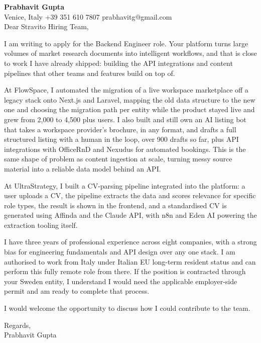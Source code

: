 \documentclass[a4paper,10.5pt]{article}
\begin{document}
\textbf{Prabhavit Gupta}\\
Venice, Italy \textbar{} +39 351 610 7807 \textbar{} prabhavitg@gmail.com\\[10pt]
Dear Stravito Hiring Team,

I am writing to apply for the Backend Engineer role. Your platform turns large volumes of market research documents into intelligent workflows, and that is close to work I have already shipped: building the API integrations and content pipelines that other teams and features build on top of.

At FlowSpace, I automated the migration of a live workspace marketplace off a legacy stack onto Next.js and Laravel, mapping the old data structure to the new one and choosing the migration path per entity while the product stayed live and grew from 2,000 to 4,500 plus users. I also built and still own an AI listing bot that takes a workspace provider's brochure, in any format, and drafts a full structured listing with a human in the loop, over 900 drafts so far, plus API integrations with OfficeRnD and Nexudus for automated bookings. This is the same shape of problem as content ingestion at scale, turning messy source material into a reliable data model behind an API.

At UltraStrategy, I built a CV-parsing pipeline integrated into the platform: a user uploads a CV, the pipeline extracts the data and scores relevance for specific role types, the result is shown in the frontend, and a standardised CV is generated using Affinda and the Claude API, with n8n and Eden AI powering the extraction tooling itself.

I have three years of professional experience across eight companies, with a strong bias for engineering fundamentals and API design over any one stack. I am authorised to work from Italy under Italian EU long-term resident status and can perform this fully remote role from there. If the position is contracted through your Sweden entity, I understand I would need the applicable employer-side permit and am ready to complete that process.

I would welcome the opportunity to discuss how I could contribute to the team.

Regards,\\
Prabhavit Gupta
\end{document}
